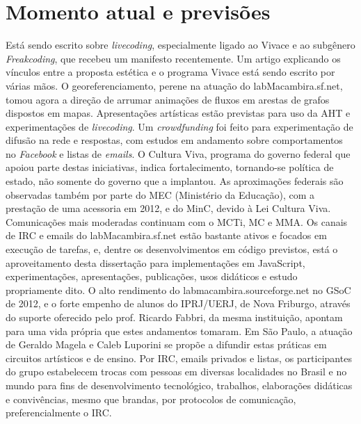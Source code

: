 \section{Momento atual e previsões}
Está sendo escrito sobre \emph{livecoding}, especialmente
ligado ao Vivace e ao subgênero \emph{Freakcoding}, que recebeu um manifesto recentemente. Um artigo explicando os vínculos entre a proposta estética e o programa Vivace está sendo escrito por várias mãos. O georeferenciamento, perene na atuação do labMacambira.sf.net, tomou agora a direção de arrumar animações de fluxos em arestas de grafos dispostos em mapas. Apresentações artísticas estão previstas para uso da AHT e experimentações de \emph{livecoding}. Um \emph{crowdfunding} foi feito para experimentação de difusão na rede e respostas, com estudos em andamento sobre comportamentos no \emph{Facebook} e listas de \emph{emails}. O Cultura Viva, programa do governo federal que apoiou parte destas iniciativas, indica fortalecimento, tornando-se política de estado, não somente do governo que a implantou. As aproximações federais são observadas também por parte do MEC (Ministério da Educação), com a prestação de uma acessoria em 2012, e do MinC, devido à Lei Cultura Viva. Comunicações mais moderadas continuam com o MCTi, MC e MMA. Os canais de IRC e emails do labMacambira.sf.net estão bastante ativos e focados em execução de tarefas, e, dentre os desenvolvimentos em código previstos, está o aproveitamento desta dissertação para implementações em JavaScript, experimentações, apresentações, publicações, usos didáticos e estudo propriamente dito. O alto rendimento do labmacambira.sourceforge.net no GSoC de 2012, e o forte empenho de alunos do IPRJ/UERJ, de Nova Friburgo, através do suporte oferecido pelo prof. Ricardo Fabbri, da mesma instituição, apontam para uma vida própria que estes andamentos tomaram. Em São Paulo, a atuação de Geraldo Magela e Caleb Luporini se propõe a difundir estas práticas em circuitos artísticos e de ensino. Por IRC, emails privados e listas, os participantes do grupo estabelecem trocas com pessoas em diversas localidades no Brasil e no mundo para fins de desenvolvimento tecnológico, trabalhos, elaborações didáticas e convivências, mesmo que brandas, por protocolos de comunicação, preferencialmente o IRC.
